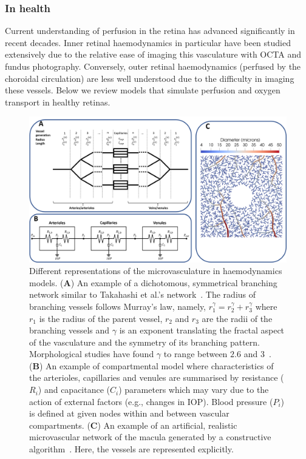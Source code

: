 \documentclass{article}
\begin{document}
\subsubsection{In health}

Current understanding of perfusion in the retina has advanced significantly in recent decades.
Inner retinal haemodynamics in particular have been studied extensively due to the relative ease of imaging this vasculature with OCTA and fundus photography.
Conversely, outer retinal haemodynamics (perfused by the choroidal circulation) are less well understood due to the difficulty in imaging these vessels.
Below we review models that simulate perfusion and oxygen transport in healthy retinas.

\begin{figure}[t!]
  \centering
  \includegraphics[width=\textwidth]{NetworkModels}
  \caption{Different representations of the microvasculature in haemodynamics models. (\textbf A) An example of a dichotomous, symmetrical branching network similar to Takahashi et al.'s network~\cite{Takahashi_2009}. The radius of branching vessels follows Murray's law, namely, $r_1^\gamma = r_2^\gamma+r_3^\gamma$ where $r_1$ is the radius of the parent vessel, $r_2$ and $r_3$ are the radii of the branching vessels and $\gamma$ is an exponent translating the fractal aspect of the vasculature and the symmetry of its branching pattern. Morphological studies have found $\gamma$ to range between $2.6$ and $3$~\cite{Ma_2021, Takahashi_2009}. (\textbf{B}) An example of compartmental model where characteristics of the arterioles, capillaries and venules are summarised by resistance ($R_i$) and capacitance ($C_i$) parameters which may vary due to the action of external factors (e.g., changes in IOP). Blood pressure ($P_i$) is defined at given nodes within and between vascular compartments. (\textbf{C}) An example of an artificial, realistic microvascular network of the macula generated by a constructive algorithm~\cite{Talou_2021}. Here, the vessels are represented explicitly.}
  \label{fig:NetworkModels}
\end{figure}
\end{document}
